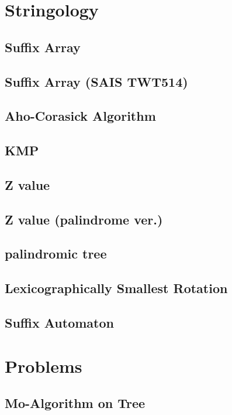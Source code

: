 \documentclass[a4paper,10pt,twocolumn,oneside]{article}
\begin{document}
\section{Stringology}
\subsection{Suffix Array}

\subsection{Suffix Array (SAIS TWT514)}

\subsection{Aho-Corasick Algorithm}

\subsection{KMP}

\subsection{Z value}

\subsection{Z value (palindrome ver.)}

\subsection{palindromic tree}

\subsection{Lexicographically Smallest Rotation}

\subsection{Suffix Automaton}


\section{Problems}
\subsection{Mo-Algorithm on Tree}

\end{document}
